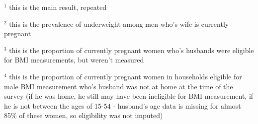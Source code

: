\documentclass[12pt]{article}
\begin{document}
\begin{table}[!htbp]
    \centering
    \begin{threeparttable}[t]
        \caption{:  Underweight prevalence of prepregnant women and men who's wife is pregnant}

        \scriptsize
        \setlength{\tabcolsep}{2pt}
        \renewcommand{\arraystretch}{1.2}

        

        \begin{tablenotes}
        \item $^1$ this is the main result, repeated
        \item $^2$ this is the prevalence of underweight among men who's wife is currently pregnant
        \item $^3$ this is the proportion of currently pregnant women who's husbands were eligible for BMI measurements, but weren't measured

        \item $^4$ this is the proportion of currently pregnant women in households eligible for male BMI measurement who's husband was not at home at the time of the survey (if he was home, he still may have been ineligible for BMI measurement, if he is not between the ages of 15-54 - husband's age data is missing for almost 85\% of these women, so eligibility was not imputed)
        
        \end{tablenotes}
    \end{threeparttable}
\end{table}




%         

\end{document}
